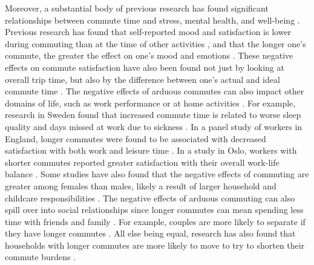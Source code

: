 \documentclass[10 pt,letterpaper]{article}
\begin{document}
Moreover, a substantial body of previous research has found significant relationships between commute time and stress, mental health, and well-being \cite{novaco_transportation_1979,stutzer_stress_2008,chatterjee_commuting_2020}. Previous research has found that self-reported mood and satisfaction is lower during commuting than at the time of other activities \cite{kahneman_survey_2004,lancee_mood_2017}, and that the longer one's commute, the greater the effect on one's mood and emotions \cite{morris_are_2015,st-louis_happy_2014}. These negative effects on commute satisfaction have also been found not just by looking at overall trip time, but also by the difference between one's actual and ideal commute time \cite{ye_analysing_2020}. The negative effects of arduous commutes can also impact other domains of life, such as work performance or at home activities \cite{chatterjee_commuting_2020}. For example, research in Sweden found that increased commute time is related to worse sleep quality and days missed at work due to sickness \cite{hansson_relationship_2011}. In a panel study of workers in England, longer commutes were found to be associated with decreased satisfaction with both work and leisure time \cite{clark_how_2020}. In a study in Oslo, workers with shorter commutes reported greater satisfaction with their overall work-life balance \cite{denstadli_urban_2017}. Some studies have also found that the negative effects of commuting are greater among females than males, likely a result of larger household and childcare responsibilities \cite{roberts_its_2011}. The negative effects of arduous commuting can also spill over into social relationships since longer commutes can mean spending less time with friends and family \cite{christian_automobile_2012}. For example, couples are more likely to separate if they have longer commutes \cite{sandow_til_2019}. All else being equal, research has also found that households with longer commutes are more likely to move to try to shorten their commute burdens \cite{huang_tracking_2018}. 
\end{document}
